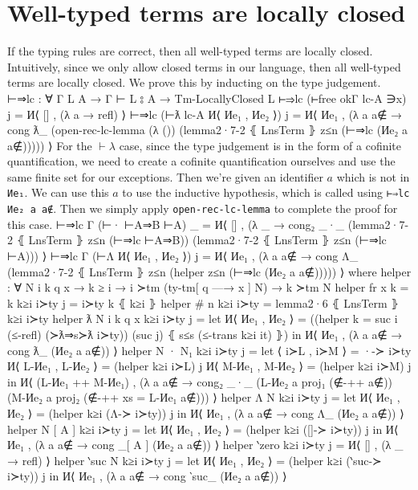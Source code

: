 \documentclass[logo,bsc,singlespacing,parskip,online]{infthesis}
\renewenvironment{code}{\mintedcopy[breaklines,breaksymbolleft=\;]{agda}}{\endmintedcopy}
\begin{document}
\section{Well-typed terms are locally closed}
If the typing rules are correct, then all well-typed terms are locally closed. Intuitively, since we
only allow closed terms in our language, then all well-typed terms are locally closed. We prove this by inducting on the type judgement.
\begin{code}
  ⊢⇒lc : ∀ {Γ L A} → Γ ⊢ L ⦂ A → Tm-LocallyClosed L
  ⊢⇒lc (⊢free okΓ lc-A ∋x) j = И⟨ [] , (λ a → refl) ⟩
  ⊢⇒lc (⊢ƛ lc-A И⟨ Иe₁ , Иe₂ ⟩) j = И⟨ Иe₁ , (λ a {a∉} → cong ƛ_
    (open-rec-lc-lemma (λ ())
      (lemma2·7-2 ⦃ LnsTerm ⦄ z≤n (⊢⇒lc (Иe₂ a {a∉}))))) ⟩
\end{code}
For the $\vdash\lambda$ case, since the type judgement is in the form of a cofinite quantification,
we need to create a cofinite quantification ourselves and use the same finite set for our
exceptions. Then we're given an identifier $a$ which is not in \texttt{Иe₁}. We can use this $a$ to
use the inductive hypothesis, which is called using \texttt{⊢⇒lc Иe₂ a {a∉}}. Then we simply apply
\texttt{open-rec-lc-lemma} to complete the proof for this case.
\begin{code}
  ⊢⇒lc {Γ} (⊢· ⊢A⇒B ⊢A) _ = И⟨ [] , (λ _ → cong₂ _·_
    (lemma2·7-2 ⦃ LnsTerm ⦄ z≤n (⊢⇒lc ⊢A⇒B))
    (lemma2·7-2 ⦃ LnsTerm ⦄ z≤n (⊢⇒lc ⊢A))) ⟩
  ⊢⇒lc {Γ} (⊢Λ И⟨ Иe₁ , Иe₂ ⟩) j =
    И⟨ Иe₁ , (λ a {a∉} →
      cong Λ_ (lemma2·7-2 ⦃ LnsTerm ⦄ z≤n
        (helper z≤n (⊢⇒lc (Иe₂ a {a∉}))))) ⟩
    where
      helper : ∀ {N i k q x} → k ≥ i → i ≻tm (ty-tm[ q —→ x ] N)
        → k ≻tm N
      helper {fr x} {k = k} k≥i i≻ty j = i≻ty k ⦃ k≥i ⦄
      helper {# n} k≥i i≻ty = lemma2·6 ⦃ LnsTerm ⦄ k≥i i≻ty
      helper {ƛ N} {i} {k} {q} {x} k≥i i≻ty j =
        let И⟨ Иe₁ , Иe₂ ⟩ = ((helper {k = suc i} (≤-refl) (≻ƛ⇒s≻ƛ i≻ty)) (suc j) ⦃ s≤s (≤-trans k≥i it) ⦄)
        in И⟨ Иe₁ , (λ a {a∉} → cong ƛ_ (Иe₂ a {a∉})) ⟩
      helper {N · N₁} k≥i i≻ty j =
        let ⟨ i≻L  , i≻M ⟩ = ·-≻ i≻ty
            И⟨ L-Иe₁ , L-Иe₂ ⟩ = (helper k≥i i≻L) j
            И⟨ M-Иe₁ , M-Иe₂ ⟩ = (helper k≥i i≻M) j
          in И⟨ (L-Иe₁ ++ M-Иe₁) , (λ a {a∉} → cong₂ _·_
            (L-Иe₂ a {proj₁ (∉-++ a∉)})
            (M-Иe₂ a {proj₂ (∉-++ {xs = L-Иe₁} a∉)})) ⟩
      helper {Λ N} k≥i i≻ty j =
        let И⟨ Иe₁ , Иe₂ ⟩ = (helper k≥i (Λ-≻ i≻ty)) j
        in И⟨ Иe₁ , (λ a {a∉} → cong Λ_ (Иe₂ a {a∉})) ⟩
      helper {N [ A ]} k≥i i≻ty j =
        let И⟨ Иe₁ , Иe₂ ⟩ = (helper k≥i ([]-≻ i≻ty)) j
        in И⟨ Иe₁ , (λ a {a∉} → cong _[ A ] (Иe₂ a {a∉})) ⟩
      helper {‵zero} k≥i i≻ty j = И⟨ [] , (λ _ → refl) ⟩
      helper {‵suc N} k≥i i≻ty j =
        let И⟨ Иe₁ , Иe₂ ⟩ = (helper k≥i (‵suc-≻ i≻ty)) j
        in И⟨ Иe₁ , (λ a {a∉} → cong ‵suc_ (Иe₂ a {a∉})) ⟩
\end{code}
\end{document}
